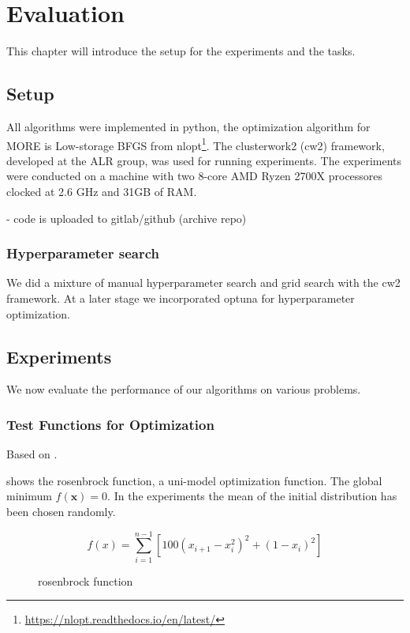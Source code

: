 
\chapter{Evaluation}
This chapter will introduce the setup for the experiments and the tasks.

\section{Setup}
All algorithms were implemented in python,
the optimization algorithm for MORE is Low-storage BFGS
from nlopt\footnote{\href{https://nlopt.readthedocs.io/en/latest/}{https://nlopt.readthedocs.io/en/latest/}}.
The clusterwork2 (cw2) framework, developed at the ALR group, was used for running experiments.
The experiments were conducted on a machine with two 8-core
AMD Ryzen 2700X processores clocked at 2.6 GHz and 31GB of RAM.

- code is uploaded to gitlab/github (archive repo)

\subsection{Hyperparameter search}
We did a mixture of manual hyperparameter search and grid search
with the cw2 framework. At a later stage we incorporated optuna
for hyperparameter optimization.

\section{Experiments}
We now evaluate the performance of our algorithms on various problems.

\subsection{Test Functions for Optimization}
Based on \citet{molga2005test}.

 shows the rosenbrock function, a uni-model optimization function. The global minimum $f(\mathbf{x}) = 0$. In the experiments
the mean of the initial distribution has been chosen randomly.

$$ f(x) = \sum^{n-1}_{i=1} [100(x_{i+1} - x_i^2)^2 + (1-x_i)^2] $$

\begin{figure}[ht!]
    \centering
    
    \caption{rosenbrock function}
    \label{fig:rosenbrock}
\end{figure}


